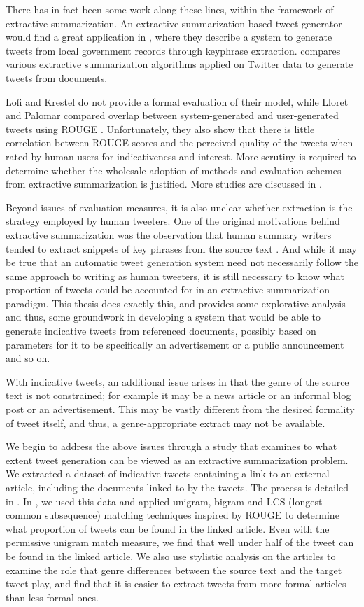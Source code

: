 There has in fact been some work along these lines, within the framework of extractive summarization. An extractive summarization based tweet generator would find a great application in \cite{lofi2012iparticipate}, where they describe a system to generate tweets from local government records through keyphrase extraction. \cite{lloret2013towards} compares various extractive summarization algorithms applied on Twitter data to generate tweets from documents. 

Lofi and Krestel do not provide a formal evaluation of their model, while Lloret and Palomar compared overlap between system-generated and user-generated tweets using ROUGE 
\cite{lin2004rouge}. Unfortunately, they also show that there is little correlation between ROUGE scores and the perceived quality of the tweets when rated by human users for indicativeness and interest. More scrutiny is required to determine whether the wholesale adoption of methods and evaluation schemes from extractive summarization is justified. More studies are discussed in .

Beyond issues of evaluation measures, it is also unclear whether extraction is the strategy employed by human tweeters. One of the original motivations behind extractive summarization was the observation that human summary writers tended to extract snippets of key phrases from the source text \cite{mani-2001}.  And while it may be true that an automatic tweet generation system need not necessarily follow the same approach to writing as human tweeters, it is still necessary to know what proportion of tweets could be accounted for in an extractive summarization paradigm. This thesis does exactly this, and provides some explorative analysis and thus, some groundwork in developing a system that would be able to generate indicative tweets from referenced documents, possibly based on parameters for it to be specifically an advertisement or a public announcement and so on.

With indicative tweets, an additional issue arises in that the genre of the source text is not constrained; for example it may be a news article or an informal blog post or an advertisement. This may be vastly different from the desired formality of tweet itself, and thus, a genre-appropriate extract may not be available.

We begin to address the above issues through a study that examines to what extent tweet generation can be viewed as an extractive summarization problem. We extracted a dataset of indicative tweets containing a link to an external article, including the documents linked to by the tweets. The process is detailed in . In , we used this data and applied unigram, bigram and LCS (longest common subsequence) matching techniques inspired by ROUGE to determine what proportion of tweets can be found in the linked article. Even with the permissive unigram match measure, we find that well under half of the tweet can be found in the linked article. We also use stylistic analysis on the articles to examine the role that genre differences between the source text and the target tweet play, and find that it is easier to extract tweets from more formal articles than less formal ones. 

